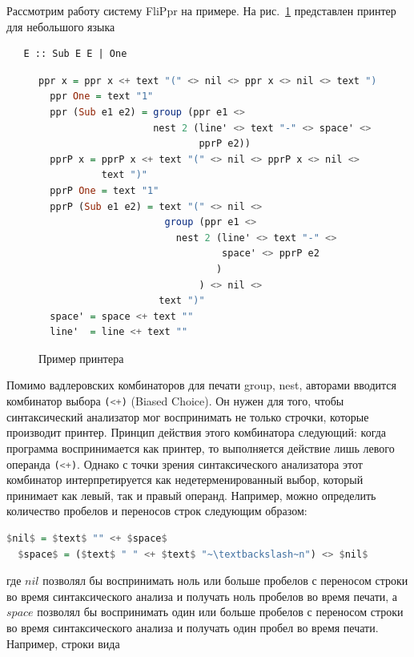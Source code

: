 Рассмотрим работу систему FliPpr на примере. На рис.~\ref{printer_example} представлен принтер 
для небольшого языка 

\begin{verbatim}
   E :: Sub E E | One
\end{verbatim}

\begin{figure}[h]
\centering
\begin{lstlisting}[language=Haskell]
  ppr x = ppr x <+ text "(" <> nil <> ppr x <> nil <> text ")"
  ppr One = text "1"
  ppr (Sub e1 e2) = group (ppr e1 <> 
                    nest 2 (line' <> text "-" <> space' <> 
                            pprP e2))
  pprP x = pprP x <+ text "(" <> nil <> pprP x <> nil <> 
           text ")"
  pprP One = text "1"
  pprP (Sub e1 e2) = text "(" <> nil <> 
                      group (ppr e1 <> 
                        nest 2 (line' <> text "-" <> 
                                space' <> pprP e2
                               )
                            ) <> nil <> 
                     text ")"
  space' = space <+ text ""
  line'  = line <+ text "" 
\end{lstlisting}
\caption{Пример принтера}
\label{printer_example}
\end{figure}

Помимо вадлеровских комбинаторов для печати group, nest, авторами вводится комбинатор выбора 
\lstinline[language=Haskell]{(<+)} (Biased Choice). Он нужен для того, чтобы синтаксический 
анализатор мог воспринимать не только строчки, которые производит принтер. Принцип действия 
этого комбинатора следующий: когда программа воспринимается как принтер, то выполняется 
действие лишь левого операнда \lstinline[language=Haskell]{(<+)}. Однако с точки зрения 
синтаксического анализатора этот комбинатор интерпретируется как недетерменированный выбор, 
который принимает как левый, так и правый операнд. Например, можно определить количество 
пробелов и переносов строк следующим образом:

\begin{lstlisting}[language=Haskell,mathescape]
  $nil$ = $text$ "" <+ $space$
  $space$ = ($text$ " " <+ $text$ "~\textbackslash~n") <> $nil$
\end{lstlisting}

\noindent где $nil$ позволял бы воспринимать ноль или больше пробелов с переносом строки во 
время синтаксического анализа и получать ноль пробелов во время печати, а  $space$ позволял 
бы воспринимать один или больше пробелов с переносом строки во время синтаксического 
анализа и получать один пробел во время печати. Например, строки вида 

